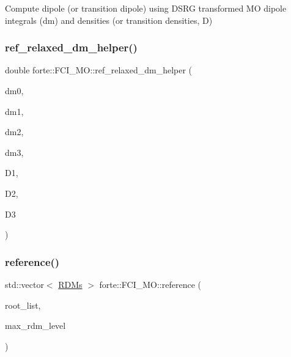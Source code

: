 Compute dipole (or transition dipole) using D\+S\+RG transformed MO dipole integrals (dm) and densities (or transition densities, D) \mbox{\label{classforte_1_1_f_c_i___m_o_ada3c9f7a2dda90005a13b8b446eeb982}} 
\subsubsection{\texorpdfstring{ref\+\_\+relaxed\+\_\+dm\+\_\+helper()}{ref\_relaxed\_dm\_helper()}\hspace{0.1cm}{\footnotesize\ttfamily [2/2]}}
{\footnotesize\ttfamily double forte\+::\+F\+C\+I\+\_\+\+M\+O\+::ref\+\_\+relaxed\+\_\+dm\+\_\+helper (\begin{DoxyParamCaption}\item[{const double \&}]{dm0,  }\item[{ambit\+::\+Blocked\+Tensor \&}]{dm1,  }\item[{ambit\+::\+Blocked\+Tensor \&}]{dm2,  }\item[{ambit\+::\+Blocked\+Tensor \&}]{dm3,  }\item[{ambit\+::\+Blocked\+Tensor \&}]{D1,  }\item[{ambit\+::\+Blocked\+Tensor \&}]{D2,  }\item[{ambit\+::\+Blocked\+Tensor \&}]{D3 }\end{DoxyParamCaption})\hspace{0.3cm}{\ttfamily [protected]}}

\mbox{\label{classforte_1_1_f_c_i___m_o_ad4629fe1009af590091c55aecf125314}} 
\subsubsection{\texorpdfstring{reference()}{reference()}\hspace{0.1cm}{\footnotesize\ttfamily [1/2]}}
{\footnotesize\ttfamily std\+::vector$<$ \mbox{\hyperlink{classforte_1_1_r_d_ms}{R\+D\+Ms}} $>$ forte\+::\+F\+C\+I\+\_\+\+M\+O\+::reference (\begin{DoxyParamCaption}\item[{const std\+::vector$<$ std\+::pair$<$ size\+\_\+t, size\+\_\+t $>$$>$ \&}]{root\+\_\+list,  }\item[{int}]{max\+\_\+rdm\+\_\+level }\end{DoxyParamCaption})}

